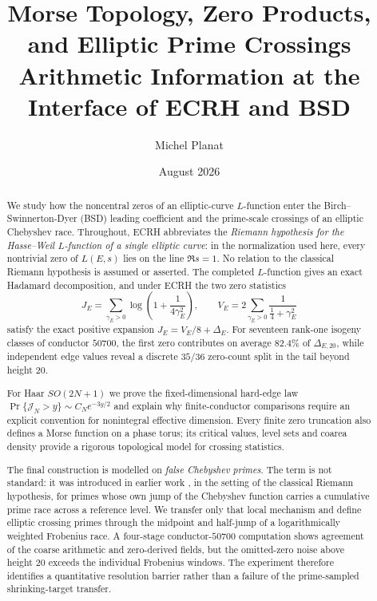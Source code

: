 \documentclass[11pt,reqno]{amsart}
\title[Morse Topology and Elliptic Prime Crossings]
{Morse Topology, Zero Products,\\ and Elliptic Prime Crossings\\[0.45em]
\normalfont\large Arithmetic Information at the Interface of ECRH and BSD}
\author{Michel Planat}
\date{August 2026}
\theoremstyle{remark}
\begin{document}
\begin{abstract}
We study how the noncentral zeros of an elliptic-curve $L$-function enter the Birch--Swinnerton-Dyer (BSD) leading coefficient and the prime-scale crossings of an elliptic Chebyshev race.  Throughout, ECRH abbreviates the \emph{Riemann hypothesis for the Hasse--Weil $L$-function of a single elliptic curve}: in the normalization used here, every nontrivial zero of $L(E,s)$ lies on the line $\Re s=1$.  No relation to the classical Riemann hypothesis is assumed or asserted.  The completed $L$-function gives an exact Hadamard decomposition, and under ECRH the two zero statistics
\[
  J_E=\sum_{\gamma_E>0}\log\!\left(1+\frac{1}{4\gamma_E^2}\right),
  \qquad
  V_E=2\sum_{\gamma_E>0}\frac{1}{\tfrac14+\gamma_E^2}
\]
satisfy the exact positive expansion $J_E=V_E/8+\Delta_E$.  For seventeen rank-one isogeny classes of conductor $50700$, the first zero contributes on average $82.4\%$ of $\Delta_{E,20}$, while independent edge values reveal a discrete $35/36$ zero-count split in the tail beyond height $20$.

For Haar $SO(2N+1)$ we prove the fixed-dimensional hard-edge law $\Pr\{\mathcal J_N>y\}\sim C_Ne^{-3y/2}$ and explain why finite-conductor comparisons require an explicit convention for nonintegral effective dimension.  Every finite zero truncation also defines a Morse function on a phase torus; its critical values, level sets and coarea density provide a rigorous topological model for crossing statistics.

The final construction is modelled on \emph{false Chebyshev primes}.  The term is not standard: it was introduced in earlier work \cite{PlanatSole2013,PlanatFalseCheb2026}, in the setting of the classical Riemann hypothesis, for primes whose own jump of the Chebyshev function carries a cumulative prime race across a reference level.  We transfer only that local mechanism and define elliptic crossing primes through the midpoint and half-jump of a logarithmically weighted Frobenius race.  A four-stage conductor-$50700$ computation shows agreement of the coarse arithmetic and zero-derived fields, but the omitted-zero noise above height $20$ exceeds the individual Frobenius windows.  The experiment therefore identifies a quantitative resolution barrier rather than a failure of the prime-sampled shrinking-target transfer.
\end{abstract}

\maketitle
\end{document}
